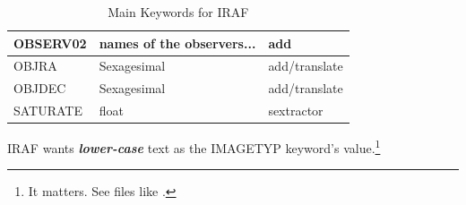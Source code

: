 \begin{table}[h!]
\begin{tabular}{ l  l l}
OBSERV02   & names of the observers...                      & add \\
\hline
OBJRA      & Sexagesimal                                    & add/translate \\
OBJDEC     & Sexagesimal                                    & add/translate \\
\hline
SATURATE   & float                                          & sextractor \\
\hline
\end{tabular}
\caption{Main Keywords for IRAF}
\label{table:MainKeywords}
\end{table}


IRAF wants \textbf{\emph{lower-case}} text as the IMAGETYP keyword's
value.\footnote{It matters. See files like
  .}

